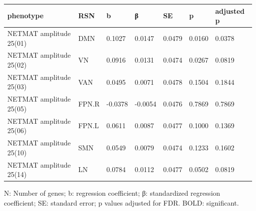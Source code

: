 \begin{refsection}
\begin{table}[H]
\small
{}\selectfont
{} \label{table3S8} 
\centering
\begin{tabular}{@{}lllllll@{}}
\hline
phenotype               & RSN & b       & β       & SE     & p & adjusted p \\ \hline
NETMAT amplitude 25(01) & DMN                & 0.1027  & 0.0147  & 0.0479 & 0.0160  & 0.0378           \\
NETMAT amplitude 25(02) & VN                 & 0.0916  & 0.0131  & 0.0474 & 0.0267  & 0.0819           \\
NETMAT amplitude 25(03) & VAN                & 0.0495  & 0.0071  & 0.0478 & 0.1504  & 0.1844           \\
NETMAT amplitude 25(05) & FPN.R              & -0.0378 & -0.0054 & 0.0476 & 0.7869  & 0.7869           \\
NETMAT amplitude 25(06) & FPN.L              & 0.0611  & 0.0087  & 0.0477 & 0.1000  & 0.1369           \\
NETMAT amplitude 25(10) & SMN                & 0.0549  & 0.0079  & 0.0474 & 0.1233  & 0.1602           \\
NETMAT amplitude 25(14) & LN                 & 0.0784  & 0.0112  & 0.0477 & 0.0502  & 0.0819           \\ \hline
\end{tabular}
{\begin{flushleft}
\scriptsize N: Number of genes; b: regression coefficient; β: standardized regression coefficient; SE: standard error; p values adjusted for FDR. BOLD: significant.
\end{flushleft}}
\end{table}



\end{refsection}
